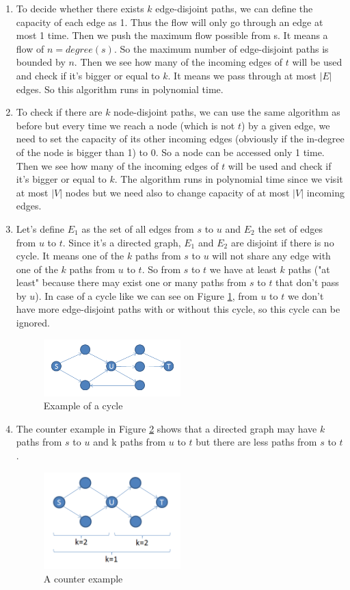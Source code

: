 \begin{enumerate}
	\item To decide whether there exists $k$ edge-disjoint paths, we can define the capacity of each edge as 1. Thus the flow will only go through an edge at most 1 time. Then we push the maximum flow possible from s. It means a flow of $n=degree(s)$. So the maximum number of edge-disjoint paths is bounded by $n$. Then we see how many of the incoming edges of $t$ will be used and check if it's bigger or equal to $k$. It means we pass through at most $|E|$ edges. So this algorithm runs in polynomial time.
	\item To check if there are $k$ node-disjoint paths, we can use the same algorithm as before but every time we reach a node (which is not $t$) by a given edge, we need to set the capacity of its other incoming edges (obviously if the in-degree of the node is bigger than 1) to 0. So a node can be accessed only 1 time. Then we see how many of the incoming edges of $t$ will be used and check if it's bigger or equal to $k$. The algorithm runs in polynomial time since we visit at most $|V|$ nodes but we need also to change capacity of at most $|V|$ incoming edges.
	\item Let's define $E_1$ as the set of all edges from $s$ to $u$ and $E_2$ the set of edges from $u$ to $t$. Since it's a directed graph, $E_1$ and $E_2$ are disjoint if there is no cycle. It means one of the $k$ paths from $s$ to $u$ will not share any edge with one of the $k$ paths from $u$ to $t$. So from $s$ to $t$ we have at least $k$ paths ("at least" because there may exist one or many paths from $s$ to $t$ that don't pass by $u$). In case of a cycle like we can see on Figure \ref{fig:cycle}, from $u$ to $t$ we don't have more edge-disjoint paths with or without this cycle, so this cycle can be ignored.
	\begin{figure}[ht]
  \centering
  \includegraphics[width=0.5\textwidth]{cycle}
  \caption{Example of a cycle}
  \label{fig:cycle}
  \end{figure}
	\item The counter example in Figure \ref{fig:prob1} shows that a directed graph may have $k$ paths from $s$ to $u$ and k paths from $u$ to $t$ but there are less paths from $s$ to $t$.
	\begin{figure}[ht]
  \centering
  \includegraphics[width=0.5\textwidth]{prob1}
  \caption{A counter example}
  \label{fig:prob1}
  \end{figure}
\end{enumerate}